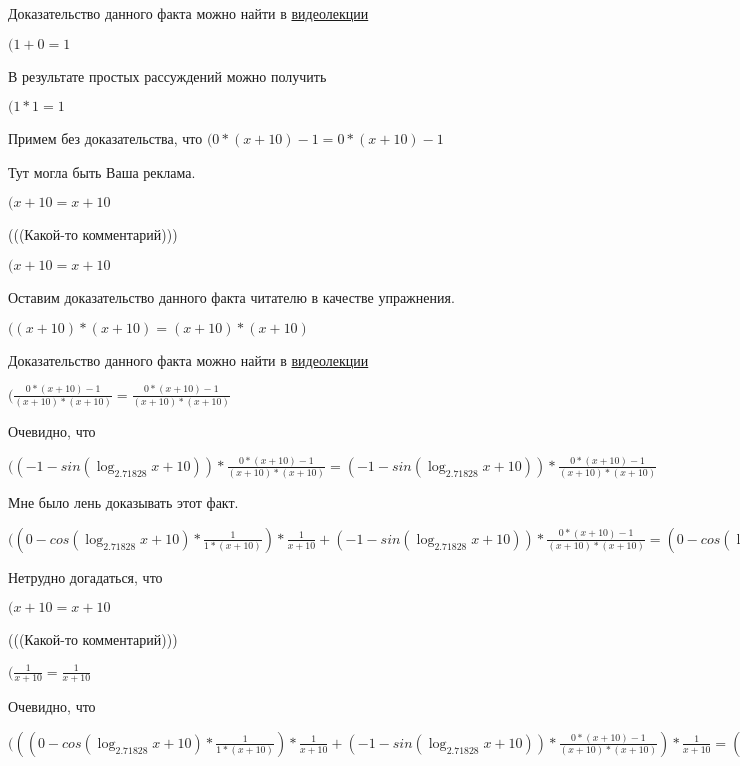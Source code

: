 \documentclass[12pt,a4paper,fleqn]{article}
\theoremstyle{definition}
\begin{document}
Доказательство данного факта можно найти в \href{https://www.youtube.com/watch?v=dQw4w9WgXcQ}{видеолекции}

$( 1  +  0  =  1 $

В результате простых рассуждений можно получить

$( 1  *  1  =  1 $

Примем без доказательства, что
$( 0  * ( x  +  10 ) -  1  =  0  * ( x  +  10 ) -  1 $

Тут могла быть Ваша реклама.

$( x  +  10  =  x  +  10 $

(((Какой-то комментарий)))

$( x  +  10  =  x  +  10 $

Оставим доказательство данного факта читателю в качестве упражнения.

$(( x  +  10 ) * ( x  +  10 ) = ( x  +  10 ) * ( x  +  10 )$

Доказательство данного факта можно найти в \href{https://www.youtube.com/watch?v=dQw4w9WgXcQ}{видеолекции}

$(\frac{ 0  * ( x  +  10 ) -  1 }{( x  +  10 ) * ( x  +  10 )}
 = \frac{ 0  * ( x  +  10 ) -  1 }{( x  +  10 ) * ( x  +  10 )}
$

Очевидно, что

$(( -1  - sin(\log_{ 2.71828 }{ x  +  10 })) * \frac{ 0  * ( x  +  10 ) -  1 }{( x  +  10 ) * ( x  +  10 )}
 = ( -1  - sin(\log_{ 2.71828 }{ x  +  10 })) * \frac{ 0  * ( x  +  10 ) -  1 }{( x  +  10 ) * ( x  +  10 )}
$

Мне было лень доказывать этот факт.

$(( 0  - cos(\log_{ 2.71828 }{ x  +  10 }) * \frac{ 1 }{ 1  * ( x  +  10 )}
) * \frac{ 1 }{ x  +  10 }
 + ( -1  - sin(\log_{ 2.71828 }{ x  +  10 })) * \frac{ 0  * ( x  +  10 ) -  1 }{( x  +  10 ) * ( x  +  10 )}
 = ( 0  - cos(\log_{ 2.71828 }{ x  +  10 }) * \frac{ 1 }{ 1  * ( x  +  10 )}
) * \frac{ 1 }{ x  +  10 }
 + ( -1  - sin(\log_{ 2.71828 }{ x  +  10 })) * \frac{ 0  * ( x  +  10 ) -  1 }{( x  +  10 ) * ( x  +  10 )}
$

Нетрудно догадаться, что

$( x  +  10  =  x  +  10 $

(((Какой-то комментарий)))

$(\frac{ 1 }{ x  +  10 }
 = \frac{ 1 }{ x  +  10 }
$

Очевидно, что

$((( 0  - cos(\log_{ 2.71828 }{ x  +  10 }) * \frac{ 1 }{ 1  * ( x  +  10 )}
) * \frac{ 1 }{ x  +  10 }
 + ( -1  - sin(\log_{ 2.71828 }{ x  +  10 })) * \frac{ 0  * ( x  +  10 ) -  1 }{( x  +  10 ) * ( x  +  10 )}
) * \frac{ 1 }{ x  +  10 }
 = (( 0  - cos(\log_{ 2.71828 }{ x  +  10 }) * \frac{ 1 }{ 1  * ( x  +  10 )}
) * \frac{ 1 }{ x  +  10 }
 + ( -1  - sin(\log_{ 2.71828 }{ x  +  10 })) * \frac{ 0  * ( x  +  10 ) -  1 }{( x  +  10 ) * ( x  +  10 )}
) * \frac{ 1 }{ x  +  10 }
$
\end{document}
